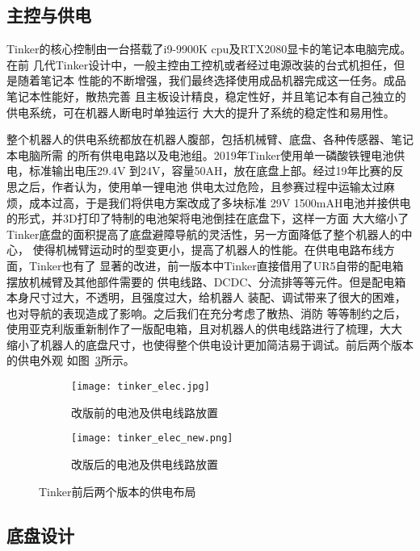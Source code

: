 \subsection{主控与供电}

Tinker的核心控制由一台搭载了i9-9900K cpu及RTX2080显卡的笔记本电脑完成。在前
几代Tinker设计中，一般主控由工控机或者经过电源改装的台式机担任，但是随着笔记本
性能的不断增强，我们最终选择使用成品机器完成这一任务。成品笔记本性能好，散热完善
且主板设计精良，稳定性好，并且笔记本有自己独立的供电系统，可在机器人断电时单独运行
大大的提升了系统的稳定性和易用性。

整个机器人的供电系统都放在机器人腹部，包括机械臂、底盘、各种传感器、笔记本电脑所需
的所有供电电路以及电池组。2019年Tinker使用单一磷酸铁锂电池供电，标准输出电压29.4V
到24V，容量50AH，放在底盘上部。经过19年比赛的反思之后，作者认为，使用单一锂电池
供电太过危险，且参赛过程中运输太过麻烦，成本过高，于是我们将供电方案改成了多块标准
29V 1500mAH电池并接供电的形式，并3D打印了特制的电池架将电池倒挂在底盘下，这样一方面
大大缩小了Tinker底盘的面积提高了底盘避障导航的灵活性，另一方面降低了整个机器人的中心，
使得机械臂运动时的型变更小，提高了机器人的性能。在供电电路布线方面，Tinker也有了
显著的改进，前一版本中Tinker直接借用了UR5自带的配电箱摆放机械臂及其他部件需要的
供电线路、DCDC、分流排等等元件。但是配电箱本身尺寸过大，不透明，且强度过大，给机器人
装配、调试带来了很大的困难，也对导航的表现造成了影响。之后我们在充分考虑了散热、消防
等等制约之后，使用亚克利版重新制作了一版配电箱，且对机器人的供电线路进行了梳理，大大
缩小了机器人的底盘尺寸，也使得整个供电设计更加简洁易于调试。前后两个版本的供电外观
如图~\ref{fig:elec}所示。

\begin{figure}
\centering
\begin{subfigure}{.5\textwidth}
  \centering
  \texttt{[image: tinker\_elec.jpg]}
  \caption{改版前的电池及供电线路放置}
  \label{fig:old_elec}
\end{subfigure}%
\begin{subfigure}{.5\textwidth}
  \centering
  \texttt{[image: tinker\_elec\_new.png]}
  \caption{改版后的电池及供电线路放置}
  \label{fig:new_elec}
\end{subfigure}
\caption{Tinker前后两个版本的供电布局}
\label{fig:elec}
\end{figure}

\subsection{底盘设计}

